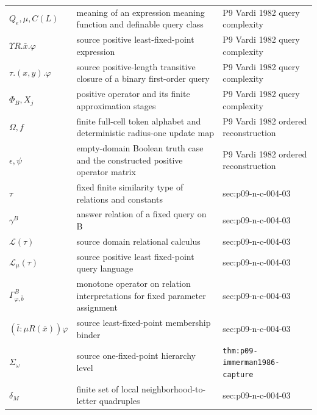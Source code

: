 \begin{longtable}{@{}p{}p{}p{}@{}}
\(Q_e,\allowbreak \mu,\allowbreak C(L)\) & meaning of an expression meaning function and definable query class & P9 Vardi 1982 query complexity \\
\(\Upsilon R.\bar x.\varphi\) & source positive least-fixed-point expression & P9 Vardi 1982 query complexity \\
\(\tau.(x,\allowbreak y).\varphi\) & source positive-length transitive closure of a binary first-order query & P9 Vardi 1982 query complexity \\
\(\Phi_B,\allowbreak X_j\) & positive operator and its finite approximation stages & P9 Vardi 1982 query complexity \\
\(\Omega,\allowbreak f\) & finite full-cell token alphabet and deterministic radius-one update map & P9 Vardi 1982 ordered reconstruction \\
\(\epsilon,\allowbreak \psi\) & empty-domain Boolean truth case and the constructed positive operator matrix & P9 Vardi 1982 ordered reconstruction \\
\(\tau\) & fixed finite similarity type of relations and constants & sec:\allowbreak{}p09-\allowbreak{}n-\allowbreak{}c-\allowbreak{}004-\allowbreak{}03 \\
\(\gamma^B\) & answer relation of a fixed query on B & sec:\allowbreak{}p09-\allowbreak{}n-\allowbreak{}c-\allowbreak{}004-\allowbreak{}03 \\
\(\mathcal L(\tau)\) & source domain relational calculus & sec:\allowbreak{}p09-\allowbreak{}n-\allowbreak{}c-\allowbreak{}004-\allowbreak{}03 \\
\(\mathcal L_\mu(\tau)\) & source positive least fixed-point query language & sec:\allowbreak{}p09-\allowbreak{}n-\allowbreak{}c-\allowbreak{}004-\allowbreak{}03 \\
\(\Gamma_{\varphi,\bar b}^B\) & monotone operator on relation interpretations for fixed parameter assignment & sec:\allowbreak{}p09-\allowbreak{}n-\allowbreak{}c-\allowbreak{}004-\allowbreak{}03 \\
\((\bar t:\mu R(\bar x))\varphi\) & source least-fixed-point membership binder & sec:\allowbreak{}p09-\allowbreak{}n-\allowbreak{}c-\allowbreak{}004-\allowbreak{}03 \\
\(\Sigma_\omega\) & source one-fixed-point hierarchy level & \texttt{thm:\allowbreak{}p09-\allowbreak{}immerman1986-\allowbreak{}capture} \\
\(\delta_M\) & finite set of local neighborhood-to-letter quadruples & sec:\allowbreak{}p09-\allowbreak{}n-\allowbreak{}c-\allowbreak{}004-\allowbreak{}03 \\

\end{longtable}
